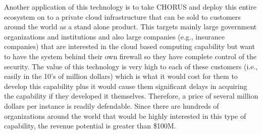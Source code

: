 Another application of this technology is to take CHORUS and deploy
this entire ecosystem on to a private cloud infrastructure that can be
sold to customers around the world as a stand alone product.  This
targets mainly large government organizations and institutions and
also large companies (e.g., insurance companies) that are interested
in the cloud based computing capability but want to have the system
behind their own firewall so they have complete control of the
security.  The value of this technology is very high to each of these
customers (i.e., easily in the 10’s of million dollars) which is what
it would cost for them to develop this capability plus it would cause
them significant delays in acquiring the capability if they developed
it themselves. Therefore, a price of several million dollars per
instance is readily defendable.  Since there are hundreds of
organizations around the world that would be highly interested in this
type of capability, the revenue potential is greater than \$100M.

